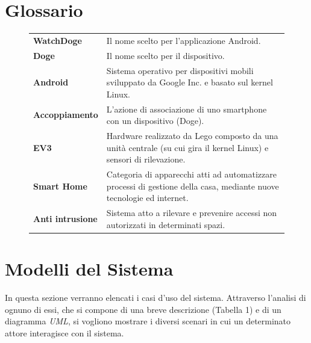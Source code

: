 \documentclass{article}
\begin{document}
\section{Glossario}

\begin{figure}[htbp]
\centering
\begin{tabular}{l p{12cm}}
\textbf{WatchDoge} & Il nome scelto per l'applicazione Android. \\
\textbf{Doge} & Il nome scelto per il dispositivo. \\
\textbf{Android} & Sistema operativo per dispositivi mobili sviluppato da Google Inc. e basato sul kernel Linux. \\
\textbf{Accoppiamento} & L'azione di associazione di uno smartphone con un dispositivo (Doge). \\
\textbf{EV3} & Hardware realizzato da Lego composto da una unità centrale (su cui gira il kernel Linux) e sensori di rilevazione. \\
\textbf{Smart Home} & Categoria di apparecchi atti ad automatizzare processi di gestione della casa, mediante nuove tecnologie ed internet. \\
\textbf{Anti intrusione} & Sistema atto a rilevare e prevenire accessi non autorizzati in determinati spazi. \\
\end{tabular}
\end{figure}

\section{Modelli del Sistema}

In questa sezione verranno elencati i casi d’uso del sistema.
Attraverso l’analisi di ognuno di essi, che si compone di una breve descrizione (Tabella 1) e di un diagramma \textit{UML}, si vogliono mostrare i diversi scenari in cui un determinato attore interagisce con il sistema.
\end{document}
